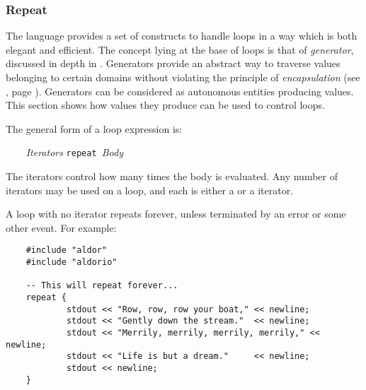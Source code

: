
\subsubsection{Repeat}


The \asharp{} language provides a set of constructs to handle loops
in a way which is both elegant and efficient. The concept lying at the
base of \asharp{} loops is that of {\em generator}, discussed
in depth in . Generators provide an abstract
way to traverse values belonging to certain domains without violating
the principle of {\em encapsulation} (see ,
page \pageref{asugLangNTypeDomEncap}). Generators can be considered as
autonomous entities producing values. This section shows how values
they produce can be used to control loops.

The general form of a loop expression is:

\verb^    ^{\em Iterators\/} {\tt repeat }{\em Body}

The iterators control how many times the body is evaluated.
Any number of iterators may be used on a loop, and each is
either a  or a  iterator.

A loop with no iterator repeats forever, unless terminated by an
error or some other event.
For example:

\begin{small}
\begin{verbatim}
    #include "aldor"
    #include "aldorio"

    -- This will repeat forever...
    repeat {
            stdout << "Row, row, row your boat," << newline;
            stdout << "Gently down the stream."  << newline;
            stdout << "Merrily, merrily, merrily, merrily," << newline;
            stdout << "Life is but a dream."     << newline;
            stdout << newline;
    }
\end{verbatim}
\end{small}

